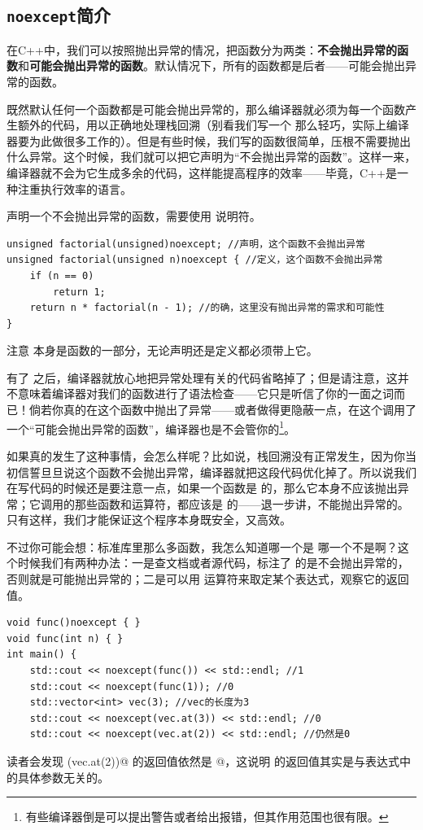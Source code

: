 \subsection*{\texttt{noexcept}简介}
在C++中，我们可以按照抛出异常的情况，把函数分为两类：\textbf{不会抛出异常的函数}和\textbf{可能会抛出异常的函数}。默认情况下，所有的函数都是后者——可能会抛出异常的函数。\par
既然默认任何一个函数都是可能会抛出异常的，那么编译器就必须为每一个函数产生额外的代码，用以正确地处理栈回溯（别看我们写一个 \lstinline@throw@ 那么轻巧，实际上编译器要为此做很多工作的）。但是有些时候，我们写的函数很简单，压根不需要抛出什么异常。这个时候，我们就可以把它声明为``不会抛出异常的函数''。这样一来，编译器就不会为它生成多余的代码，这样能提高程序的效率——毕竟，C++是一种注重执行效率的语言。\par
声明一个不会抛出异常的函数，需要使用 \lstinline@noexcept@ 说明符。
\begin{lstlisting}
unsigned factorial(unsigned)noexcept; //声明，这个函数不会抛出异常
unsigned factorial(unsigned n)noexcept { //定义，这个函数不会抛出异常
    if (n == 0)
        return 1;
    return n * factorial(n - 1); //的确，这里没有抛出异常的需求和可能性
}
\end{lstlisting}\par
注意 \lstinline@noexcept@ 本身是函数的一部分，无论声明还是定义都必须带上它。\par
有了 \lstinline@noexcept@ 之后，编译器就放心地把异常处理有关的代码省略掉了；但是请注意，这并不意味着编译器对我们的函数进行了语法检查——它只是听信了你的一面之词而已！倘若你真的在这个函数中抛出了异常——或者做得更隐蔽一点，在这个调用了一个``可能会抛出异常的函数''，编译器也是不会管你的\footnote{有些编译器倒是可以提出警告或者给出报错，但其作用范围也很有限。}。\par
如果真的发生了这种事情，会怎么样呢？比如说，栈回溯没有正常发生，因为你当初信誓旦旦说这个函数不会抛出异常，编译器就把这段代码优化掉了。所以说我们在写代码的时候还是要注意一点，如果一个函数是 \lstinline@noexcept@ 的，那么它本身不应该抛出异常；它调用的那些函数和运算符，都应该是 \lstinline@noexcept@ 的——退一步讲，不能抛出异常的。只有这样，我们才能保证这个程序本身既安全，又高效。\par
不过你可能会想：标准库里那么多函数，我怎么知道哪一个是 \lstinline@noexcept@ 哪一个不是啊？这个时候我们有两种办法：一是查文档或者源代码，标注了 \lstinline@noexcept@ 的是不会抛出异常的，否则就是可能抛出异常的；二是可以用 \lstinline@noexcept@ 运算符来取定某个表达式，观察它的返回值。
\begin{lstlisting}
void func()noexcept { }
void func(int n) { }
int main() {
    std::cout << noexcept(func()) << std::endl; //1
    std::cout << noexcept(func(1)); //0
    std::vector<int> vec(3); //vec的长度为3
    std::cout << noexcept(vec.at(3)) << std::endl; //0
    std::cout << noexcept(vec.at(2)) << std::endl; //仍然是0
\end{lstlisting}
读者会发现 \lstinline@noexcept(vec.at(2))@ 的返回值依然是 @，这说明 \lstinline@noexcept@ 的返回值其实是与表达式中的具体参数无关的。\par
